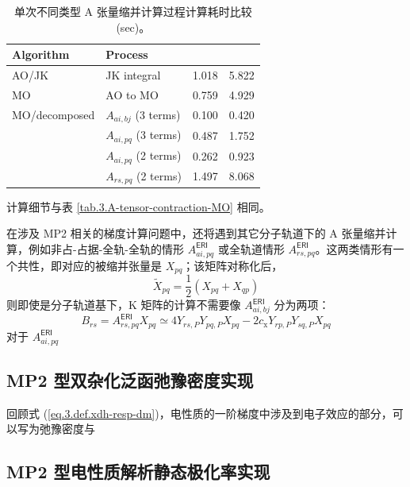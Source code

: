 \begin{table}[h]
  \centering
  \caption{单次不同类型 A 张量缩并计算过程计算耗时比较 (sec)。}
  \label{tab.3.A-tensor-contraction-more-MO}
  \begin{tabular}{ll:d{2.4}d{2.4}}
  \hline
  Algorithm     & Process          &  &  \\ \hline
  AO/JK         & JK integral      & 1.018 & 5.822  \\
  MO            & AO to MO         & 0.759 & 4.929  \\
  MO/decomposed & $A_{ai, bj}$ (3 terms) & 0.100 & 0.420  \\
                & $A_{ai, pq}$ (3 terms) & 0.487 & 1.752  \\
                & $A_{ai, pq}$ (2 terms) & 0.262 & 0.923  \\
                & $A_{rs, pq}$ (2 terms) & 1.497 & 8.068  \\ \hline
  \end{tabular}

  \raggedright
   计算细节与表 \ref{tab.3.A-tensor-contraction-MO} 相同。
\end{table}

在涉及 MP2 相关的梯度计算问题中，还将遇到\alert{其它分子轨道}下的 A 张量缩并计算，例如非占-占据-全轨-全轨的情形 $A_{ai, pq}^\textsf{ERI}$ 或全轨道情形 $A_{rs, pq}^\textsf{ERI}$。这两类情形有一个共性，即对应的被缩并张量是 $X_{pq}$；该矩阵对称化后，
\begin{equation*}
  \tilde X_{pq} = \frac{1}{2} \left( X_{pq} + X_{qp} \right)
\end{equation*}
则即使是分子轨道基下，K 矩阵的计算不需要像 $A_{ai, bj}^\textsf{ERI}$ 分为两项：
\begin{equation}
  B_{rs} = A_{rs, pq}^\textsf{ERI} X_{pq} \simeq 4 Y_{rs, P} Y_{pq, P} X_{pq} - 2 c_\mathrm{x} Y_{rp, P} Y_{sq, P} X_{pq}
\end{equation}
对于 $A_{ai, pq}^\textsf{ERI}$ 


\subsection{MP2 型双杂化泛函弛豫密度实现}

回顾式 (\ref{eq.3.def.xdh-resp-dm})，电性质的一阶梯度中涉及到电子效应的部分，可以写为弛豫密度与

\subsection{MP2 型电性质解析静态极化率实现}

